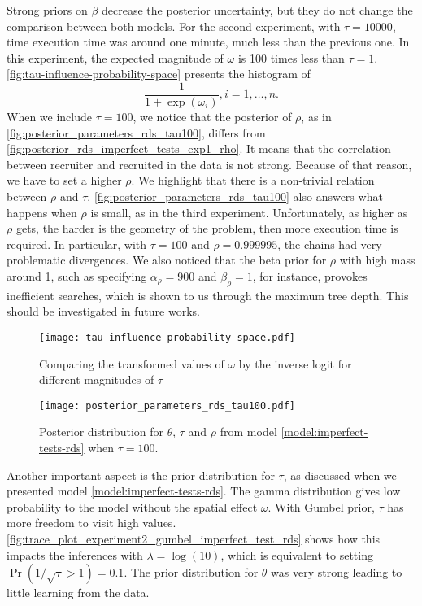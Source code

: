 Strong priors on $\beta$ decrease the posterior uncertainty, but they do not
change the comparison between both models. For the second experiment, with
$\tau = 10000$, time execution time was around one minute, much less than the
previous one. In this experiment, the expected magnitude of $\omega$ is
100 times less than $\tau = 1$. \autoref{fig:tau-influence-probability-space}
presents the histogram of 
$$
\frac{1}{1 + \exp(\omega_i)}, i = 1, \dots, n.
$$
When we include $\tau = 100$, we notice that the posterior of $\rho$, as in
\autoref{fig:posterior_parameters_rds_tau100}, differs from
\autoref{fig:posterior_rds_imperfect_tests_exp1_rho}. It means that the
correlation between recruiter and recruited in the data is not strong. Because
of that reason, we have to set a higher $\rho$. We highlight that there is a non-trivial
relation between $\rho$ and $\tau$.
\autoref{fig:posterior_parameters_rds_tau100} also answers what happens when
$\rho$ is small, as in the third experiment. Unfortunately, as higher as $\rho$
gets, the harder is the geometry of the problem, then more execution time is
required. In particular, with $\tau = 100$ and $\rho = 0.999995$, the chains
had very problematic divergences. We also noticed that the beta prior for
$\rho$ with high mass around 1, such as specifying $\alpha_{\rho} = 900$ and
$\beta_{\rho} = 1$, for instance, provokes inefficient searches, which is
shown to us through the maximum tree depth. This should be investigated in
future works. 

\begin{figure}
  \centering
  \caption{\label{fig:tau-influence-probability-space}Comparing
  the transformed values of $\omega$ by the inverse logit for different
  magnitudes of $\tau$}
  \texttt{[image: tau-influence-probability-space.pdf]}
\end{figure}

\begin{figure}
  \centering
  \caption{\label{fig:posterior_parameters_rds_tau100}Posterior distribution
  for $\theta$, $\tau$ and $\rho$ from model \eqref{model:imperfect-tests-rds}
  when $\tau = 100$.}
  \texttt{[image: posterior\_parameters\_rds\_tau100.pdf]}
\end{figure}

Another important aspect is the prior distribution for $\tau$, as discussed
when we presented model \eqref{model:imperfect-tests-rds}. The gamma
distribution gives low probability to the model without the spatial effect
$\omega$. With Gumbel prior, $\tau$ has more freedom to visit high values.
\autoref{fig:trace_plot_experiment2_gumbel_imperfect_test_rds} shows how this
impacts the inferences with $\lambda = \log(10)$, which is equivalent to setting
$\Pr(1/\sqrt{\tau} > 1) = 0.1$. The prior distribution for $\theta$ was very
strong leading to little learning from the data. 

